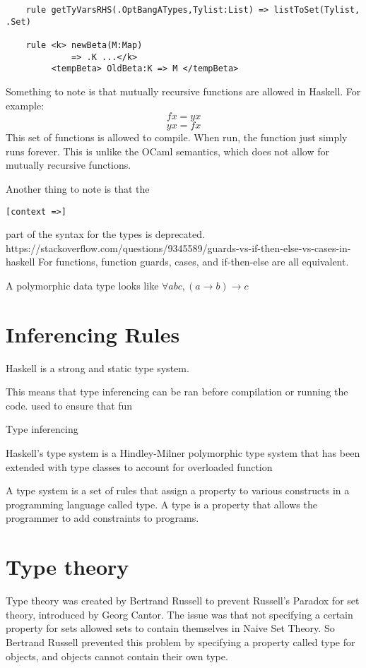 \begin{lstlisting}
    rule getTyVarsRHS(.OptBangATypes,Tylist:List) => listToSet(Tylist, .Set)

    rule <k> newBeta(M:Map)
             => .K ...</k>
         <tempBeta> OldBeta:K => M </tempBeta>
\end{lstlisting}

Something to note is that mutually recursive functions are allowed in Haskell.
For example:
$$
f x = y x
$$
$$
y x = f x
$$
This set of functions is allowed to compile. When run, the function just simply runs forever. This is unlike the OCaml semantics, which does not allow for mutually recursive functions.

Another thing to note is that the
\begin{lstlisting}
[context =>]
\end{lstlisting}
part of the syntax for the types is deprecated.
https://stackoverflow.com/questions/9345589/guards-vs-if-then-else-vs-cases-in-haskell
For functions, function guards, cases, and if-then-else are all equivalent.

A polymorphic data type looks like $\forall a b c, (a \rightarrow b) \rightarrow c$

\section{Inferencing Rules}

Haskell is a strong and static type system.

This means that type inferencing can be ran before compilation or running the code. used to ensure that fun

Type inferencing 

Haskell's type system is a Hindley-Milner polymorphic type system that has been extended with type classes to account for overloaded function

A type system is a set of rules that assign a property to various constructs in a programming language called type. A type is a property that allows the programmer to add constraints to programs.

\section{Type theory}
Type theory was created by Bertrand Russell to prevent Russell's Paradox for set theory, introduced by Georg Cantor. The issue was that not specifying a certain property for sets allowed sets to contain themselves in Naive Set Theory. So Bertrand Russell prevented this problem by specifying a property called type for objects, and objects cannot contain their own type.

